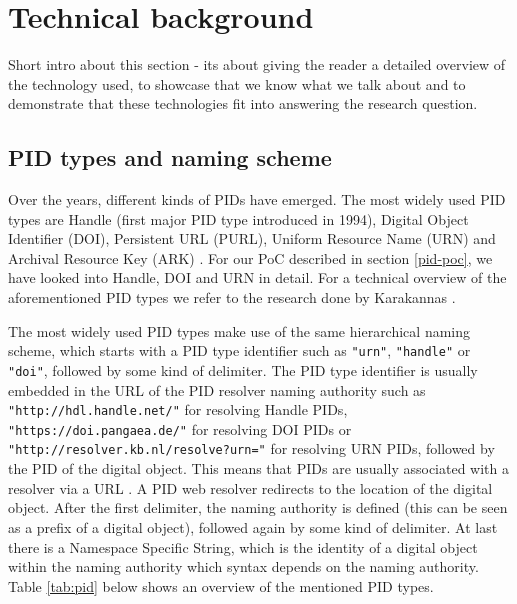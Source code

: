\section{Technical background}\label{tech-oview}
Short intro about this section - its about giving the reader a detailed overview of the technology used, to showcase that we know what we talk about and to demonstrate that these technologies fit into answering the research question.

\subsection{PID types and naming scheme}\label{pid-types}
Over the years, different kinds of PIDs have emerged. The most widely used PID types are Handle (first major PID type introduced 
in 1994), Digital Object Identifier (DOI), Persistent URL (PURL), Uniform Resource Name (URN) and 
Archival Resource Key (ARK) \cite{pid-oview, odin, hdl}. For our PoC described in section \ref{pid-poc}, we have looked into Handle, DOI and URN in detail. For a technical overview of the aforementioned PID types we refer to the research done by Karakannas \cite{icn-bd}. 

The most widely used PID types make use of the same hierarchical naming scheme, which starts with a PID type identifier
 such as \texttt{"urn"}, \texttt{"handle"} or \texttt{"doi"}, followed by some kind of delimiter. The PID type identifier is usually embedded in the URL of the PID resolver naming authority 
such as \texttt{"http://hdl.handle.net/"} for resolving Handle PIDs, \texttt{"https://doi.pangaea.de/"} for resolving DOI PIDs or \texttt{"http://resolver.kb.nl/resolve?urn="} for resolving URN PIDs, followed by the PID of the digital object. This means that PIDs are usually associated with a resolver via a URL \cite{ids, icn-bd}. A PID web resolver redirects to the location of the digital object.
After the first delimiter, the naming authority is defined (this can be seen as a prefix of a digital object), followed again 
by some kind of delimiter. At last there is a Namespace Specific String, which is the identity of a digital object within the naming authority which syntax depends on the naming
authority. Table \ref{tab:pid} below shows an overview of the mentioned PID types. 


